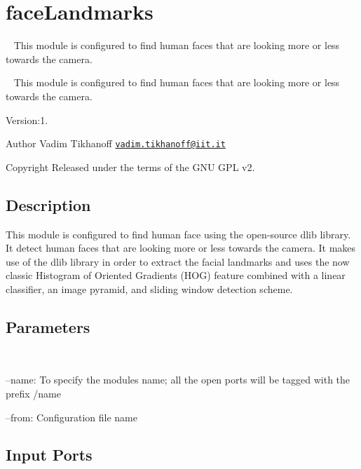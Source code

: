 \section{face\+Landmarks}
\label{group__faceLandmarks}


~\newline
 This module is configured to find human faces that are looking more or less towards the camera.  


~\newline
 This module is configured to find human faces that are looking more or less towards the camera. 

Version\+:1. \begin{DoxyAuthor}{Author}
Vadim Tikhanoff \href{mailto:vadim.tikhanoff@iit.it}{\tt vadim.\+tikhanoff@iit.\+it} ~\newline
 
\end{DoxyAuthor}
\begin{DoxyCopyright}{Copyright}
Released under the terms of the G\+NU G\+PL v2. 
\end{DoxyCopyright}
\hypertarget{group__yarpOpenPose_intro_sec}{}\subsection{Description}\label{group__yarpOpenPose_intro_sec}
\begin{DoxyVerb}This module is configured to find human face using the open-source dlib library. It detect human faces that are looking more or less towards the camera. It makes use of the dlib library in order to extract the facial landmarks and uses the now classic Histogram of Oriented Gradients (HOG) feature combined with a linear classifier, an image pyramid, and sliding window detection scheme.
\end{DoxyVerb}


 \hypertarget{group__yarpOpenPose_parameters_sec}{}\subsection{Parameters}\label{group__yarpOpenPose_parameters_sec}
~\newline

\begin{DoxyItemize}
\item --name\+: To specify the module\textquotesingle{}s name; all the open ports will be tagged with the prefix /name
\item --from\+: Configuration file name 
\end{DoxyItemize}\hypertarget{group__yarpOpenPose_inputports_sec}{}\subsection{Input Ports}\label{group__yarpOpenPose_inputports_sec}

